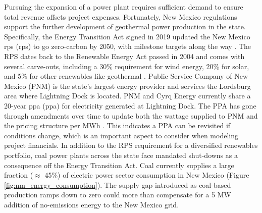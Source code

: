 Pursuing the expansion of a power plant requires sufficient demand to ensure total revenue offsets project expenses. Fortunately, New Mexico regulations support the further development of geothermal power production in the state. Specifically, the Energy Transition Act signed in 2019 updated the New Mexico \acrlong{rps} (\acrshort{rps}) to go zero-carbon by 2050, with milestone targets along the way \citep{lillian_new_2019}. The RPS dates back to the Renewable Energy Act passed in 2004 and comes with several carve-outs, including a 30\% requirement for wind energy, 20\% for solar, and 5\% for other renewables like geothermal \citep{dsire_dsire_2021}. Public Service Company of New Mexico (PNM) is the state’s largest energy provider and services the Lordsburg area where Lightning Dock is located. PNM and Cyrq Energy currently share a 20-year \acrlong{ppa} (\acrshort{ppa}) for electricity generated at Lightning Dock. The PPA has gone through amendments over time to update both the wattage supplied to PNM and the pricing structure per MWh \citep[e.g.,][]{pnm_public_2014,stanfield_new_2017}. This indicates a PPA can be revisited if conditions change, which is an important aspect to consider when modeling project financials. 
In addition to the RPS requirement for a diversified renewables portfolio, coal power plants across the state face mandated shut-downs as a consequence off the Energy Transition Act. Coal currently supplies a large fraction ($\approx$ 45\%) of electric power sector consumption in New Mexico (Figure \ref{fig:nm_energy_consumption}). The supply gap introduced as coal-based production ramps down to zero could more than compensate for a 5 MW addition of no-emissions energy to the New Mexico grid.

